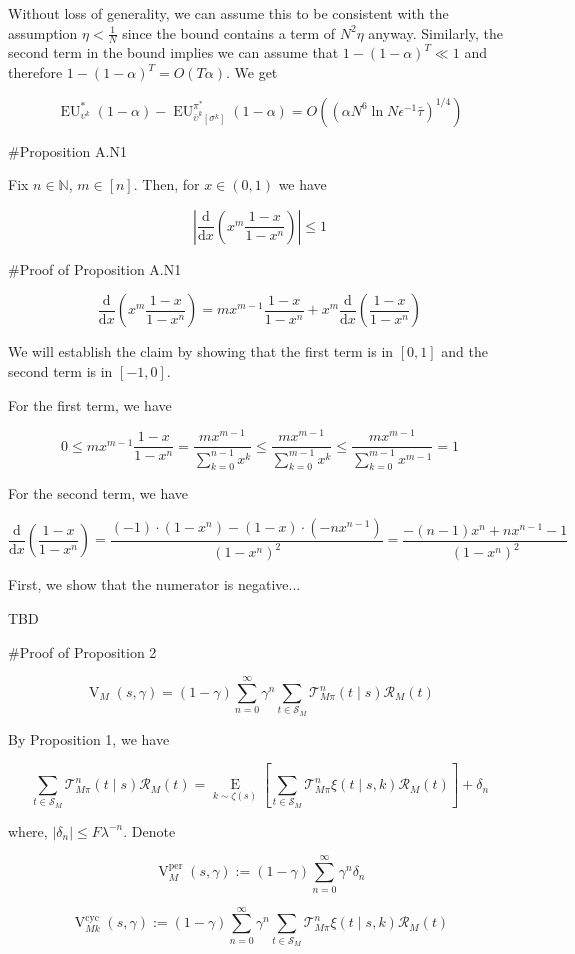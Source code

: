 \documentclass[a4paper]{article}
\newcommand{\AP}[1]{\left(#1\right)}
\newcommand{\AB}[1]{\left[#1\right]}
\newcommand{\Ea}[2]{\underset{#1}{\operatorname{E}}\AB{#2}}
\newcommand{\D}{\mathrm{d}}
\newcommand{\Nats}{\mathbb{N}}
\newcommand{\Abs}[1]{\left\vert #1 \right\vert}
\newcommand{\St}{\mathcal{S}}
\newcommand{\T}{\mathcal{T}}
\newcommand{\R}{\mathcal{R}}
\newcommand{\V}{\operatorname{V}}
\newcommand{\EU}{\operatorname{EU}}
\begin{document}
Without loss of generality, we can assume this to be consistent with the assumption $\eta < \frac{1}{N}$ since the bound contains a term of $N^2\eta$ anyway. Similarly, the second term in the bound implies we can assume that $1 - (1-\alpha)^T \ll 1$ and therefore $1 - (1-\alpha)^T = O(T\alpha)$. We get

$$\EU^{*}_{\upsilon^k}(1-\alpha)-\EU^{\pi^{*}}_{\bar{\upsilon}^k\AB{\sigma^k}}(1-\alpha) = O\AP{\AP{\alpha N^6 \ln{N} \epsilon^{-1} \bar{\tau}}^{1/4}}$$

\#Proposition A.N1

Fix $n \in \Nats$, $m \in [n]$. Then, for $x \in (0,1)$ we have

$$\Abs{\frac{\D}{\D x}\AP{x^m\frac{1-x}{1-x^n}}} \leq 1$$

\#Proof of Proposition A.N1

$$\frac{\D}{\D x}\AP{x^m\frac{1-x}{1-x^n}} = mx^{m-1}\frac{1-x}{1-x^n}+x^m\frac{\D}{\D x}\AP{\frac{1-x}{1-x^n}}$$

We will establish the claim by showing that the first term is in $[0,1]$ and the second term is in $[-1,0]$.

For the first term, we have

$$0 \leq mx^{m-1}\frac{1-x}{1-x^n} = \frac{mx^{m-1}}{\sum_{k=0}^{n-1} x^k} \leq \frac{mx^{m-1}}{\sum_{k=0}^{m-1} x^k} \leq \frac{mx^{m-1}}{\sum_{k=0}^{m-1} x^{m-1}}=1$$

For the second term, we have

$$\frac{\D}{\D x}\AP{\frac{1-x}{1-x^n}} = \frac{(-1)\cdot\AP{1-x^n}-(1-x)\cdot\AP{-nx^{n-1}}}{\AP{1-x^n}^2}=\frac{-(n-1)x^n+nx^{n-1}-1}{\AP{1-x^n}^2}$$

First, we show that the numerator is negative...

TBD

\#Proof of Proposition 2

$$\V_M(s,\gamma) = (1-\gamma) \sum_{n=0}^\infty \gamma^n \sum_{t \in \St_M} \T_{M\pi}^n (t \mid s) \R_M(t)$$

By Proposition 1, we have

$$\sum_{t \in \St_M} \T_{M\pi}^n(t \mid s) \R_M(t) = \Ea{k \sim \zeta(s)}{\sum_{t \in \St_M} \T_{M\pi}^n \xi(t \mid s,k) \R_M(t)} + \delta_n$$

where, $\Abs{\delta_n} \leq F \lambda^{-n}$. Denote

$$\V_M^{\text{per}}(s,\gamma) := (1-\gamma) \sum_{n=0}^\infty \gamma^n \delta_n$$

$$\V_{Mk}^{\text{cyc}}(s,\gamma) := (1-\gamma) \sum_{n=0}^\infty \gamma^n \sum_{t \in \St_M} \T_{M\pi}^n \xi(t \mid s,k) \R_M(t)$$
\end{document}
